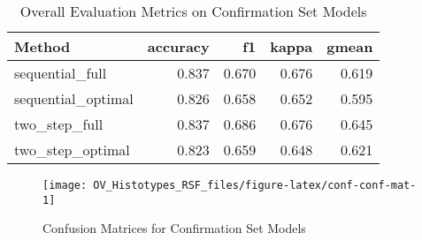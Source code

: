 \documentclass[
]{report}
\begin{document}
\begin{table}

\caption{\label{tab:conf-eval-overall}Overall Evaluation Metrics on Confirmation Set Models}
\centering
\begin{tabular}[t]{l|r|r|r|r}
\hline
Method & accuracy & f1 & kappa & gmean\\
\hline
sequential\_full & 0.837 & 0.670 & 0.676 & 0.619\\
\hline
sequential\_optimal & 0.826 & 0.658 & 0.652 & 0.595\\
\hline
two\_step\_full & 0.837 & 0.686 & 0.676 & 0.645\\
\hline
two\_step\_optimal & 0.823 & 0.659 & 0.648 & 0.621\\
\hline
\end{tabular}
\end{table}

\begin{figure}[H]

{\centering \texttt{[image: OV\_Histotypes\_RSF\_files/figure-latex/conf-conf-mat-1]} 

}

\caption{Confusion Matrices for Confirmation Set Models}\label{fig:conf-conf-mat}
\end{figure}
\end{document}
